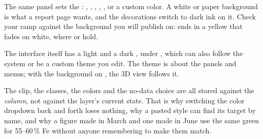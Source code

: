 The same panel sets the : , , , , , or a custom color. A white or paper background is what a report page wants, and the decorations switch to dark ink on it. Check your ramp against the background you will publish on:  ends in a yellow that fades on white, where  or  hold.

The interface itself has a light and a dark , under , which can also follow the system or be a custom theme you edit. The theme is about the panels and menus; with the background on , the 3D view follows it.

\begin{why}
The clip, the classes, the colors and the no-data choice are all stored against the \emph{column}, not against the layer's current state. That is why switching the color dropdown back and forth loses nothing, why a pasted style can find its target by name, and why a figure made in March and one made in June use the same green for 55–60\,\% Fe without anyone remembering to make them match.
\end{why}

